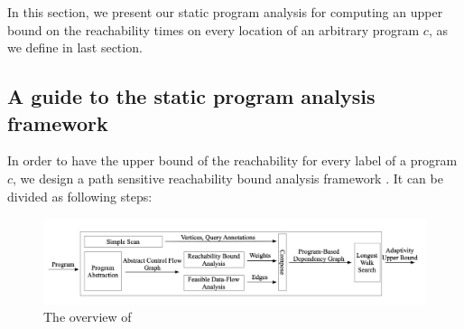 In this section, we present our static program analysis for computing an upper bound on the 
reachability times on every location of an arbitrary program $c$, as we define in last section.
%
\subsection{A guide to the static program analysis framework}
In order to have the upper bound of the  reachability for every label of a program $c$, we design 
a path sensitive reachability bound analysis framework {\THESYSTEM}.
It can be divided as following steps: 
\begin{figure}
  \centering    
\includegraphics[width=1.0\columnwidth]{adapfun.png}
  \vspace{-0.3cm}
  \caption{The overview of {\THESYSTEM}}
  \label{fig:adaptfun}
  \vspace{-0.5cm}
\end{figure}
%
%
